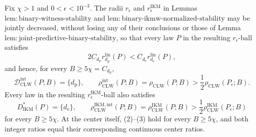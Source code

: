 Fix \(\chi>1\) and \(0<\epsilon<10^{-3}\).  The radii \(r_\epsilon\) and \(r_\epsilon^{\mathrm{IKM}}\) in Lemmas~\(\mathrm{lem{:}binary\text{-}witness\text{-}stability}\) and \(\mathrm{lem{:}binary\text{-}ikmw\text{-}normalized\text{-}stability}\) may be jointly decreased, without losing any of their conclusions or those of Lemma~\(\mathrm{lem{:}joint\text{-}predictive\text{-}binary\text{-}stability}\), so that every law \(P\) in the resulting \(r_\epsilon\)-ball satisfies
\[
 2C_{d_{\mathrm p}}r_{d_{\mathrm p}}^{\mathrm{lin}}(P)
 <C_{d_{\mathrm e}}r_{d_{\mathrm e}}^{\mathrm{lin}}(P),   \tag{1}
\]
and hence, for every \(B\ge5\chi=C_{d_{\mathrm p}}\),
\[
 \mathcal D_{\mathrm{CLW}}^{\mathrm{int}}(P;B)=\{d_{\mathrm p}\},
 \qquad
 \rho_{\mathrm{CLW}}^{\mathrm{int}}(P;B)=\rho_{\mathrm{CLW}}(P;B)
 >\frac12\rho_{\mathrm{CLW}}(P_\epsilon;B).               \tag{2}
\]
Every law in the resulting \(r_\epsilon^{\mathrm{IKM}}\)-ball also satisfies
\[
 D_{\mathrm{IKM}}^*(P)=\{d_{\mathrm e}\},
 \qquad
 \rho_{\mathrm{CLW}}^{\mathrm{IKM,int}}(P;B)
 =\rho_{\mathrm{CLW}}^{\mathrm{IKM}}(P;B)
 >\frac12\rho_{\mathrm{CLW}}^{\mathrm{IKM}}(P_\epsilon;B) \tag{3}
\]
for every \(B\ge5\chi\).  At the center itself, (2)--(3) hold for every \(B\ge5\chi\), and both integer ratios equal their corresponding continuous center ratios.